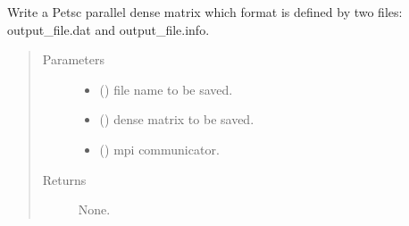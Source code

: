 \documentclass[letterpaper,10pt,english]{sphinxmanual}
\begin{document}
\begin{fulllineitems}
\label{\detokenize{petgem/parallel:petgem.parallel.writeParallelDenseMatrix}}
Write a Petsc parallel dense matrix which format is defined by two files: output\_file.dat and output\_file.info.
\begin{quote}\begin{description}
\item[{Parameters}] \leavevmode\begin{itemize}
\item {} 
 () \textendash{} file name to be saved.

\item {} 
 () \textendash{} dense matrix to be saved.

\item {} 
 () \textendash{} mpi communicator.

\end{itemize}

\item[{Returns}] \leavevmode
None.

\end{description}\end{quote}

\end{fulllineitems}

\end{document}
